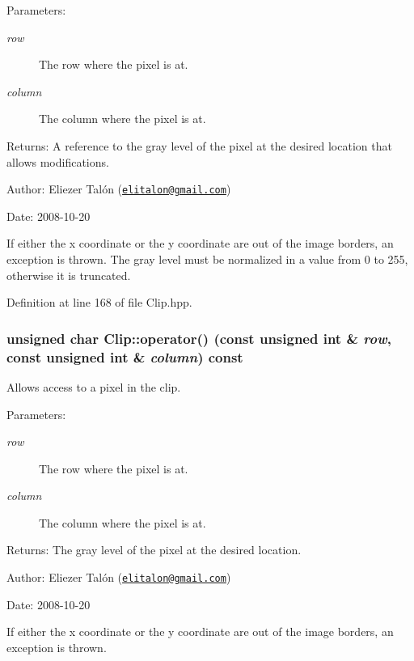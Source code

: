 \begin{Desc}
\item[Parameters:]
\begin{description}
\item[{\em row}]The row where the pixel is at. \item[{\em column}]The column where the pixel is at.\end{description}
\end{Desc}
\begin{Desc}
\item[Returns:]A reference to the gray level of the pixel at the desired location that allows modifications.\end{Desc}
\begin{Desc}
\item[Author:]Eliezer Talón (\href{mailto:elitalon@gmail.com}{\tt elitalon@gmail.com}) \end{Desc}
\begin{Desc}
\item[Date:]2008-10-20\end{Desc}
If either the x coordinate or the y coordinate are out of the image borders, an exception is thrown. The gray level must be normalized in a value from 0 to 255, otherwise it is truncated. 

Definition at line 168 of file Clip.hpp.\hypertarget{class_clip_16b24276181affc5086cb4fe83269fb8}{
\subsubsection[operator()]{\setlength{\rightskip}{0pt plus 5cm}unsigned char Clip::operator() (const unsigned int \& {\em row}, \/  const unsigned int \& {\em column}) const}}
\label{class_clip_16b24276181affc5086cb4fe83269fb8}


Allows access to a pixel in the clip. 

\begin{Desc}
\item[Parameters:]
\begin{description}
\item[{\em row}]The row where the pixel is at. \item[{\em column}]The column where the pixel is at.\end{description}
\end{Desc}
\begin{Desc}
\item[Returns:]The gray level of the pixel at the desired location.\end{Desc}
\begin{Desc}
\item[Author:]Eliezer Talón (\href{mailto:elitalon@gmail.com}{\tt elitalon@gmail.com}) \end{Desc}
\begin{Desc}
\item[Date:]2008-10-20\end{Desc}
If either the x coordinate or the y coordinate are out of the image borders, an exception is thrown. 


